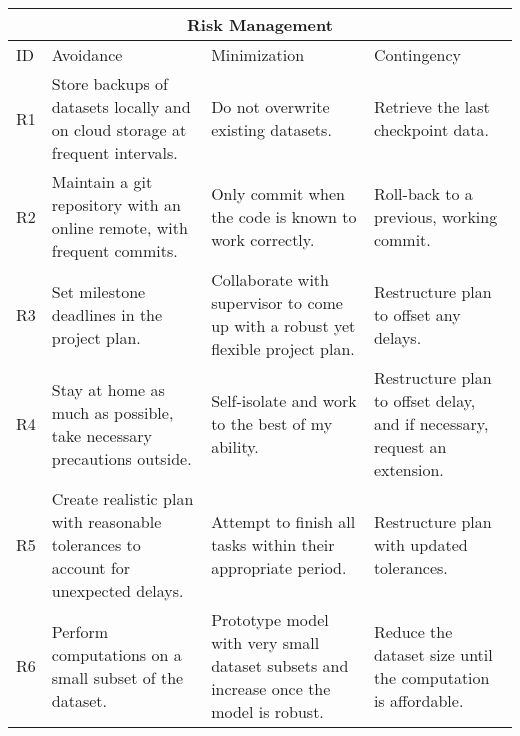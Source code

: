 \documentclass[a4paper,11pt]{article}
\begin{document}
\begin{longtable}[c]{|p{}|p{}|p{}|p{}|}
\hline
\multicolumn{4}{|c|}{Risk Management}                                                                                                                                                                                                                        \\ \hline

ID & Avoidance                                                                          & Minimization                                                                           & Contingency                                                               \\ \midrule
\endhead
R1 & Store backups of datasets locally and on cloud storage at frequent intervals.      & Do not overwrite existing datasets.                                                    & Retrieve the last checkpoint data.                                        \\ \midrule
R2 & Maintain a git repository with an online remote, with frequent commits.            & Only commit when the code is known to work correctly.                                  & Roll-back to a previous, working commit.                                  \\ \midrule
R3 & Set milestone deadlines in the project plan.                                       & Collaborate with supervisor to come up with a robust yet flexible project plan.        & Restructure plan to offset any delays.                                    \\ \midrule
R4 & Stay at home as much as possible, take necessary precautions outside.              & Self-isolate and work to the best of my ability.                                       & Restructure plan to offset delay, and if necessary, request an extension. \\ \midrule
R5 & Create realistic plan with reasonable tolerances to account for unexpected delays. & Attempt to finish all tasks within their appropriate period.                           & Restructure plan with updated tolerances.                                 \\ \midrule
R6 & Perform computations on a small subset of the dataset.                             & Prototype model with very small dataset subsets and increase once the model is robust. & Reduce the dataset size until the computation is affordable.              \\ \bottomrule
\end{longtable}
\newpage
\printbibliography
\end{document}
